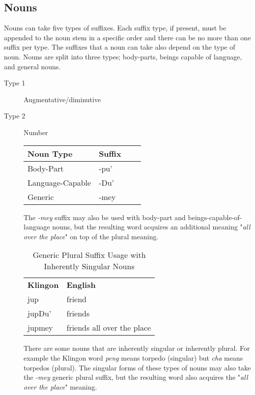 \documentclass[11pt]{article}
\begin{document}
\subsection {Nouns}

Nouns can take five types of suffixes. Each suffix type, if present, must be appended to the noun stem in a specific order and there can be no more than one suffix per type. The suffixes that a noun can take also depend on the type of noun. Nouns are split into three types; body-parts, beings capable of language, and general nouns.

\begin{description}
	\item[Type 1] Augmentative/diminutive
	\item[Type 2] Number

	\begin{center}
	\begin{tabular}{ | l | l | l | l |}
	\hline
	\bf{Noun Type} & \bf{Suffix} \\ \hline
	Body-Part & -pu' \\ \hline
	Language-Capable & -Du' \\ \hline
	Generic & -mey \\
	\hline
	\end{tabular}
	\end{center}
	
	The \textit{-mey} suffix may also be used with body-part and beings-capable-of-language nouns, but the resulting word acquires an additional meaning "\textit{all over the place}" on top of the plural meaning.
	
\begin{table}[h]
\begin{center}
\begin{tabular}{l|l}
\bf Klingon & \bf English \\
jup & friend \\
jupDu' & friends \\
jupmey & friends all over the place \\
\end{tabular}
\end{center}
\caption{Generic Plural Suffix Usage with Inherently Singular Nouns}
\end{table}

	There are some nouns that are inherently singular or inherently plural. For example the Klingon word \textit{peng} means torpedo (singular) but \textit{cha} means torpedos (plural). The singular forms of these types of nouns may also take the \textit{-mey} generic plural suffix, but the resulting word also acquires the "\textit{all over the place}" meaning.
	

\end{description}
\end{document}
